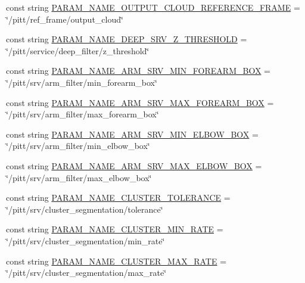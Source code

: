 \begin{DoxyCompactItemize}
\item 
const string \hyperlink{namespacesrvm_a2984c458ad628e1230d49e4f1a3ee84a}{P\-A\-R\-A\-M\-\_\-\-N\-A\-M\-E\-\_\-\-O\-U\-T\-P\-U\-T\-\_\-\-C\-L\-O\-U\-D\-\_\-\-R\-E\-F\-E\-R\-E\-N\-C\-E\-\_\-\-F\-R\-A\-M\-E} = \char`\"{}/pitt/ref\-\_\-frame/output\-\_\-cloud\char`\"{}
\item 
const string \hyperlink{namespacesrvm_af5f0c98fe811a1ad130ec625e9b2cf75}{P\-A\-R\-A\-M\-\_\-\-N\-A\-M\-E\-\_\-\-D\-E\-E\-P\-\_\-\-S\-R\-V\-\_\-\-Z\-\_\-\-T\-H\-R\-E\-S\-H\-O\-L\-D} = \char`\"{}/pitt/service/deep\-\_\-filter/z\-\_\-threshold\char`\"{}
\item 
const string \hyperlink{namespacesrvm_a78229888a94a0362b2a4242a212e496f}{P\-A\-R\-A\-M\-\_\-\-N\-A\-M\-E\-\_\-\-A\-R\-M\-\_\-\-S\-R\-V\-\_\-\-M\-I\-N\-\_\-\-F\-O\-R\-E\-A\-R\-M\-\_\-\-B\-O\-X} = \char`\"{}/pitt/srv/arm\-\_\-filter/min\-\_\-forearm\-\_\-box\char`\"{}
\item 
const string \hyperlink{namespacesrvm_a566bcfbd837fb5450a2c9c6de09d522a}{P\-A\-R\-A\-M\-\_\-\-N\-A\-M\-E\-\_\-\-A\-R\-M\-\_\-\-S\-R\-V\-\_\-\-M\-A\-X\-\_\-\-F\-O\-R\-E\-A\-R\-M\-\_\-\-B\-O\-X} = \char`\"{}/pitt/srv/arm\-\_\-filter/max\-\_\-forearm\-\_\-box\char`\"{}
\item 
const string \hyperlink{namespacesrvm_ae85ac94c938b94bb075b175237d198b0}{P\-A\-R\-A\-M\-\_\-\-N\-A\-M\-E\-\_\-\-A\-R\-M\-\_\-\-S\-R\-V\-\_\-\-M\-I\-N\-\_\-\-E\-L\-B\-O\-W\-\_\-\-B\-O\-X} = \char`\"{}/pitt/srv/arm\-\_\-filter/min\-\_\-elbow\-\_\-box\char`\"{}
\item 
const string \hyperlink{namespacesrvm_afeb3197fee2f13444309f3e4ed314392}{P\-A\-R\-A\-M\-\_\-\-N\-A\-M\-E\-\_\-\-A\-R\-M\-\_\-\-S\-R\-V\-\_\-\-M\-A\-X\-\_\-\-E\-L\-B\-O\-W\-\_\-\-B\-O\-X} = \char`\"{}/pitt/srv/arm\-\_\-filter/max\-\_\-elbow\-\_\-box\char`\"{}
\item 
const string \hyperlink{namespacesrvm_a606c20312640e9cc8710e4d43f0cb167}{P\-A\-R\-A\-M\-\_\-\-N\-A\-M\-E\-\_\-\-C\-L\-U\-S\-T\-E\-R\-\_\-\-T\-O\-L\-E\-R\-A\-N\-C\-E} = \char`\"{}/pitt/srv/cluster\-\_\-segmentation/tolerance\char`\"{}
\item 
const string \hyperlink{namespacesrvm_a68216326c13293ff70084f03bb4efa98}{P\-A\-R\-A\-M\-\_\-\-N\-A\-M\-E\-\_\-\-C\-L\-U\-S\-T\-E\-R\-\_\-\-M\-I\-N\-\_\-\-R\-A\-T\-E} = \char`\"{}/pitt/srv/cluster\-\_\-segmentation/min\-\_\-rate\char`\"{}
\item 
const string \hyperlink{namespacesrvm_ac57a3b8f3addc024383db76f1d2c55da}{P\-A\-R\-A\-M\-\_\-\-N\-A\-M\-E\-\_\-\-C\-L\-U\-S\-T\-E\-R\-\_\-\-M\-A\-X\-\_\-\-R\-A\-T\-E} = \char`\"{}/pitt/srv/cluster\-\_\-segmentation/max\-\_\-rate\char`\"{}

\end{DoxyCompactItemize}
